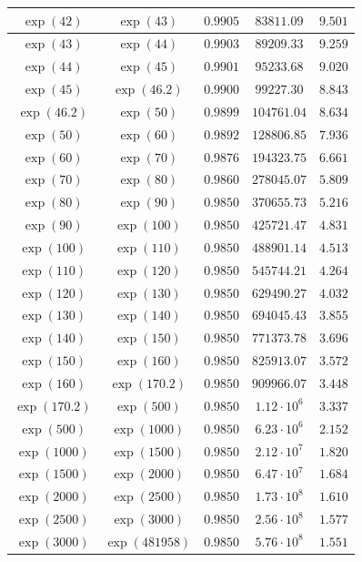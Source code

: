 \documentclass[reqno]{amsart}
\numberwithin{equation}{section}
\theoremstyle{remark}
\begin{document}
\begin{table}[h]
\begin{tabular}{|c|c|c|c|c|}
\hline
$\exp(42)$ & $\exp(43)$ & $0.9905$ & $83811.09$ & $9.501$\\
\hline
$\exp(43)$ & $\exp(44)$ & $0.9903$ & $ 89209.33$ & $9.259$\\
\hline
$\exp(44)$ & $\exp(45)$ & $0.9901$ & $95233.68$ & $9.020$\\
\hline
$\exp(45)$ & $\exp(46.2)$ & $0.9900$ & $99227.30$ & $8.843$\\
\hline
$\exp(46.2)$ & $\exp(50)$ & $0.9899 $ & $104761.04 $ & $8.634 $\\
\hline
$\exp(50)$ & $\exp(60)$ & $0.9892 $ & $128806.85 $ & $7.936 $\\
\hline
$\exp(60)$ & $\exp(70)$ & $0.9876 $ & $194323.75$ & $6.661 $\\
\hline
$\exp(70)$ & $\exp(80)$ & $0.9860 $ & $278045.07 $ & $5.809$\\
\hline
$\exp(80)$ & $\exp(90)$ & $0.9850 $ & $370655.73$ & $5.216 $\\
\hline
$\exp(90)$ & $\exp(100)$ & $0.9850 $ & $425721.47$ & $4.831 $\\
\hline
$\exp(100)$ & $\exp(110)$ & $0.9850 $ & $488901.14$ & $4.513 $\\
\hline
$\exp(110)$ & $\exp(120)$ & $0.9850 $ & $545744.21$ & $4.264 $\\
\hline
$\exp(120)$ & $\exp(130)$ & $0.9850$ & $629490.27$ & $4.032$\\
\hline
$\exp(130)$ & $\exp(140)$ & $0.9850$ & $694045.43$ & $3.855$\\
\hline
$\exp(140)$ & $\exp(150)$ & $0.9850$ & $771373.78$ & $3.696$\\
\hline
$\exp(150)$ & $\exp(160)$ & $0.9850$ & $825913.07$ & $3.572$\\
\hline
$\exp(160)$ & $\exp(170.2)$ & $0.9850$ & $909966.07$ & $3.448$\\
\hline
$\exp(170.2)$ & $\exp(500)$ & $0.9850$  & $1.12\cdot 10^6$ & $3.337$ \\
\hline
$\exp(500)$ & $\exp(1000)$ & $0.9850$  & $6.23\cdot 10^6$ & $2.152$ \\
\hline
$\exp(1000)$ & $\exp(1500)$ & $0.9850$ & $2.12\cdot 10^7$ & $1.820$ \\
\hline
$\exp(1500)$ & $\exp(2000)$ & $0.9850$ & $6.47\cdot 10^7$ & $1.684$ \\
\hline
$\exp(2000)$ & $\exp(2500)$ & $0.9850$ & $1.73\cdot 10^8$ & $1.610$\\
\hline
$\exp(2500)$ & $\exp(3000)$ & $0.9850$ & $2.56\cdot 10^8$ & $1.577$\\
\hline
$\exp(3000)$ & $\exp(481958)$ & $0.9850$ & $5.76\cdot 10^8$ & $1.551$\\
\hline
\end{tabular}
\label{valuesCB}
\end{table}
\end{document}

